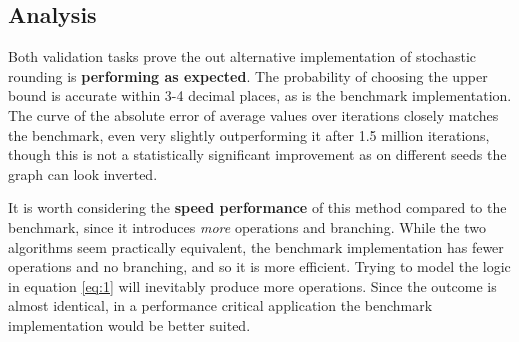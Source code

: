 \documentclass[a4paper]{article} %
\begin{document}
\subsection{Analysis}
Both validation tasks prove the out alternative implementation of stochastic rounding is \textbf{performing as expected}. The probability of choosing the upper bound is accurate within 3-4 decimal places, as is the benchmark implementation. The curve of the absolute error of average values over iterations closely matches the benchmark, even very slightly outperforming it after 1.5 million iterations, though this is not a statistically significant improvement as on different seeds the graph can look inverted.
\par
It is worth considering the \textbf{speed performance} of this method compared to the benchmark, since it introduces \textit{more} operations and branching. While the two algorithms seem practically equivalent, the benchmark implementation has fewer operations and no branching, and so it is more efficient. Trying to model the logic in equation \ref{eq:1} will inevitably produce more operations. Since the outcome is almost identical, in a performance critical application the benchmark implementation would be better suited.


\end{document}
